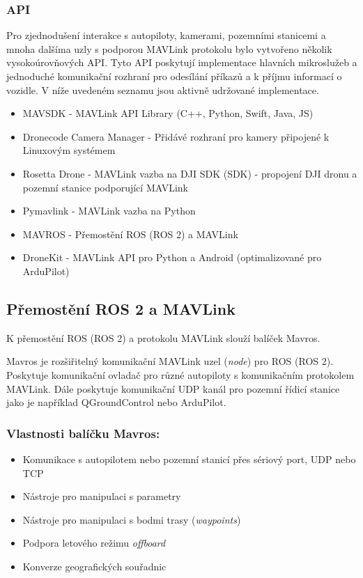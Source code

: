 \subsubsection{API}

Pro zjednodušení interakce s autopiloty, kamerami, pozemními stanicemi a mnoha dalšíma uzly s podporou MAVLink protokolu bylo vytvořeno několik vysokoúrovňových \acs{API}. Tyto \acs{API} poskytují implementace hlavních mikroslužeb a jednoduché komunikační rozhraní pro odesílání příkazů a k příjmu informací o vozidle. V níže uvedeném seznamu jsou aktivně udržované implementace.

\begin{itemize}
    \item MAVSDK - MAVLink API Library (C++, Python, Swift, Java, JS) 
    \item Dronecode Camera Manager - Přidávé rozhraní pro kamery připojené k Linuxovým systémem
    \item Rosetta Drone - MAVLink vazba na DJI \acs{SDK} (\acl{SDK}) - propojení DJI dronu a pozemní stanice podporující MAVLink
    \item Pymavlink - MAVLink vazba na Python
    \item MAVROS - Přemostění ROS (ROS 2) a MAVLink
    \item DroneKit - MAVLink API pro Python a Android (optimalizované pro ArduPilot)
\end{itemize}

\subsection{Přemostění ROS 2 a MAVLink}

K přemostění ROS (ROS 2) a protokolu MAVLink slouží balíček Mavros. \cite{MAVROS}

Mavros je rozšiřitelný komunikační MAVLink uzel (\textit{node}) pro ROS (ROS 2). Poskytuje komunikační ovladač pro různé autopiloty s komunikačním protokolem MAVLink. Dále poskytuje komunikační UDP kanál pro pozemní řídicí stanice jako je například QGroundControl nebo ArduPilot.

\subsubsection{Vlastnosti balíčku Mavros:}

\begin{itemize}
    \item Komunikace s autopilotem nebo pozemní stanicí přes sériový port, UDP nebo TCP
    \item Nástroje pro manipulaci s parametry
    \item Nástroje pro manipulaci s bodmi trasy (\textit{waypoints})
    \item Podpora letového režimu \textit{offboard}
    \item Konverze geografických souřadnic
\end{itemize}

